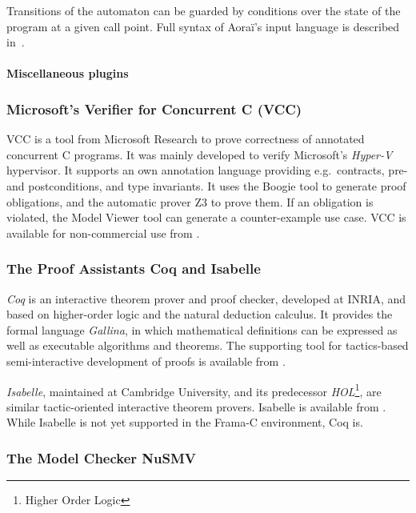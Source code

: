 \documentclass{template/openetcs_report}
\begin{document}
Transitions of the automaton can be guarded by conditions over the state of the
program at a given call point. Full syntax of Aoraï's input language is 
described in~\cite{aorai}.

\paragraph{Miscellaneous plugins}

\subsubsection{Microsoft's Verifier for Concurrent C (VCC)}

VCC is a tool from Microsoft Research
to prove correctness of annotated concurrent C programs.
It was mainly developed to verify Microsoft's \emph{Hyper-V} hypervisor.
%
It supports an own annotation language providing
e.g.\ contracts, pre- and postconditions, and type invariants.
%
It uses the Boogie tool to generate proof obligations,
and the automatic prover Z3 to prove them.
%
If an obligation is violated, the Model Viewer tool can generate a
counter-example use case.
%
VCC is available for non-commercial use from \cite{vcc}.


\subsubsection{The Proof Assistants Coq and Isabelle}


{\em Coq} is an interactive theorem prover and proof checker,
developed at INRIA, and based on
higher-order logic and the natural deduction calculus.
%
It provides the formal language {\em Gallina}, in which
mathematical definitions can be expressed as well as
executable algorithms and theorems.
%
The supporting tool for tactics-based semi-interactive development of
proofs is available from \cite{coq}.
%

{\em Isabelle}, maintained at Cambridge University,
and its predecessor {\em HOL}\footnote{
        Higher Order Logic
},
are similar tactic-oriented interactive theorem provers.
%
Isabelle is available from \cite{isabelle}.
%
While Isabelle is not yet supported in the Frama-C environment,
Coq is.


\subsubsection{The Model Checker NuSMV}
\end{document}
